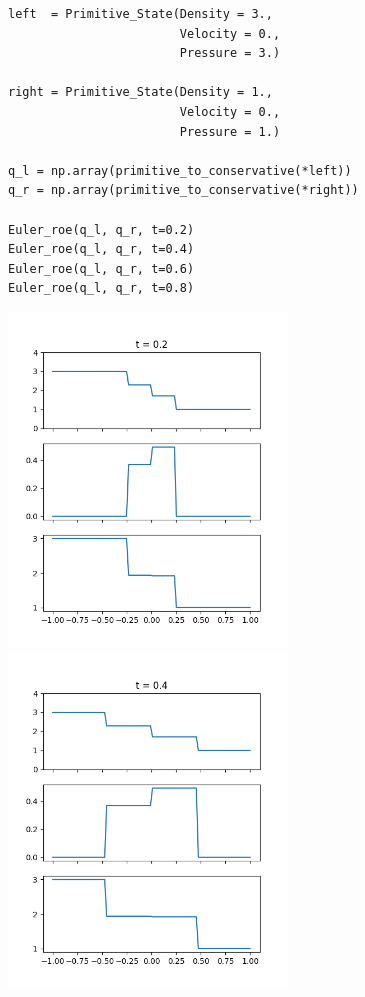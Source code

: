 \documentclass[12pt,fleqn]{article}\usepackage{../../common}
\begin{document}
\begin{verbatim}    
left  = Primitive_State(Density = 3.,
                        Velocity = 0.,
                        Pressure = 3.)

right = Primitive_State(Density = 1.,
                        Velocity = 0.,
                        Pressure = 1.)

q_l = np.array(primitive_to_conservative(*left))
q_r = np.array(primitive_to_conservative(*right))

Euler_roe(q_l, q_r, t=0.2)
Euler_roe(q_l, q_r, t=0.4)
Euler_roe(q_l, q_r, t=0.6)
Euler_roe(q_l, q_r, t=0.8)
\end{verbatim}

\includegraphics[width=20em]{euler-roe-20.png}
\includegraphics[width=20em]{euler-roe-40.png}
\end{document}
